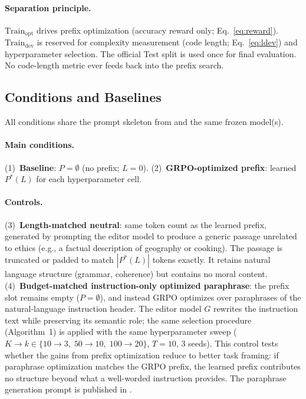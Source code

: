 \documentclass[preprint]{article}
\newcommand{\Trainopt}{\text{Train}_{\text{opt}}}
\newcommand{\Traindev}{\text{Train}_{\text{dev}}}
\begin{document}
\paragraph{Separation principle.}
$\Trainopt$ drives prefix optimization (accuracy reward only; Eq.~\ref{eq:reward}).
$\Traindev$ is reserved for complexity measurement (code length; Eq.~\ref{eq:ldev}) and hyperparameter selection.
The official Test split is used once for final evaluation.
No code-length metric ever feeds back into the prefix search.

\subsection{Conditions and Baselines}
\label{sec:baselines}

All conditions share the prompt skeleton from  and the same frozen model(s).

\paragraph{Main conditions.}
(1)~\textbf{Baseline}: $P = \emptyset$ (no prefix; $L{=}0$).
(2)~\textbf{GRPO-optimized prefix}: learned $P^*(L)$ for each hyperparameter cell.

\paragraph{Controls.}
(3)~\textbf{Length-matched neutral}: same token count as the learned prefix, generated by prompting the editor model to produce a generic passage unrelated to ethics (e.g., a factual description of geography or cooking).
The passage is truncated or padded to match $|P^*(L)|$ tokens exactly.
It retains natural language structure (grammar, coherence) but contains no moral content.
(4)~\textbf{Budget-matched instruction-only optimized paraphrase}: the prefix slot remains empty ($P = \emptyset$), and instead GRPO optimizes over paraphrases of the natural-language instruction header.
The editor model $G$ rewrites the instruction text while preserving its semantic role; the same selection procedure (Algorithm~1) is applied with the same hyperparameter sweep ($K{\to}k \in \{10{\to}3,\; 50{\to}10,\; 100{\to}20\}$, $T = 10$, 3 seeds).
This control tests whether the gains from prefix optimization reduce to better task framing: if paraphrase optimization matches the GRPO prefix, the learned prefix contributes no structure beyond what a well-worded instruction provides.
The paraphrase generation prompt is published in .
\end{document}
